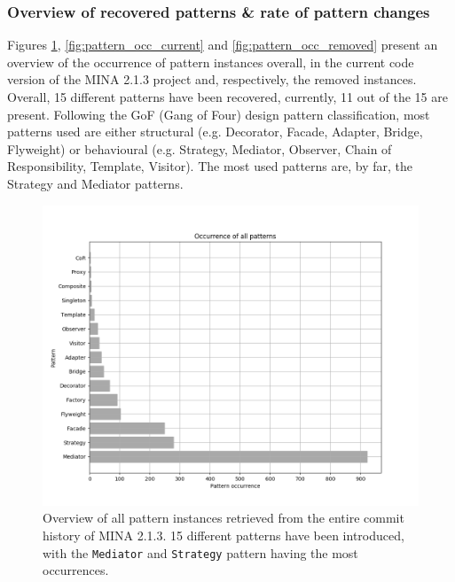 \subsubsection{Overview of recovered patterns \& rate of pattern changes}
Figures \ref{fig:pattern_occ_all}, \ref{fig:pattern_occ_current} and \ref{fig:pattern_occ_removed} present an overview of the occurrence of pattern instances overall, in the current code version of the MINA 2.1.3 project and, respectively, the removed instances. Overall, 15 different patterns have been recovered, currently, 11 out of the 15 are present. Following the GoF (Gang of Four) \cite{gof} design pattern classification, most patterns used are either structural (e.g. Decorator, Facade, Adapter, Bridge, Flyweight) or behavioural (e.g. Strategy, Mediator, Observer, Chain of Responsibility, Template, Visitor). The most used patterns are, by far, the Strategy and Mediator patterns. 
\begin{figure}
    \centering
    \includegraphics[width = \textwidth]{images/graphs/pattern_occurrence_all.png}
    \caption{Overview of all pattern instances retrieved from the entire commit history of MINA 2.1.3. 15 different patterns have been introduced, with the \texttt{Mediator} and \texttt{Strategy} pattern having the most occurrences.}
    \label{fig:pattern_occ_all}
\end{figure}
